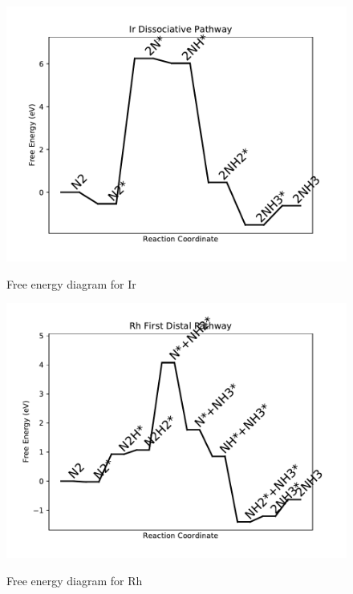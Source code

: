 \documentclass{article}
\begin{document}
\begin{figure}
\includegraphics[width=1\linewidth]{data/plots/Ir_dissociative.pdf}
\label{fig:Ir_dissociative}
\caption{Free energy diagram for Ir}
\end{figure}

\clearpage
\begin{figure}
\includegraphics[width=1\linewidth]{data/plots/Rh_distal_1.pdf}
\label{fig:Rh_distal_1}
\caption{Free energy diagram for Rh}
\end{figure}
\end{document}
